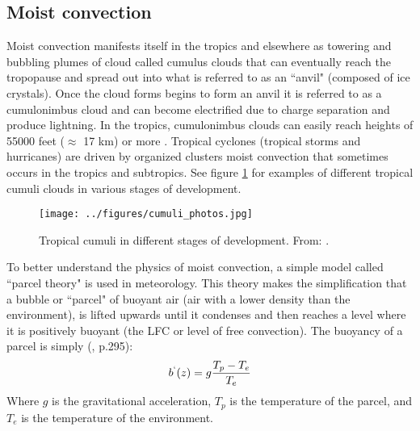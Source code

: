 \documentclass[letterpaper,12pt,titlepage,oneside,final]{book}
\begin{document}
\subsection{Moist convection}\label{moist}

Moist convection manifests itself in the tropics and elsewhere as towering and bubbling plumes of cloud called cumulus clouds that can eventually reach the tropopause and spread out into what is referred to as an ``anvil" (composed of ice crystals). Once the cloud forms begins to form an anvil it is referred to as a cumulonimbus cloud and can become electrified due to charge separation and produce lightning. In the tropics, cumulonimbus clouds can easily reach heights of 55000 feet ($\approx$ 17 km) or more \citep{hollars_comparisons_2004}. Tropical cyclones (tropical storms and hurricanes) are driven by organized clusters moist convection that sometimes occurs in the tropics and subtropics. See figure \ref{fig:cumu} for examples of different tropical cumuli clouds in various stages of development.

\begin{figure}[H]
\centering
\noindent\texttt{[image: ../figures/cumuli\_photos.jpg]}\hfill
\caption{Tropical cumuli in different stages of development. From: \citep{evans_introduction_2011}.}
\label{fig:cumu}
\end{figure}

To better understand the physics of moist convection, a simple model called ``parcel theory" is used in meteorology. This theory makes the simplification that a bubble or ``parcel" of buoyant air (air with a lower density than the environment), is lifted upwards until it condenses and then reaches a level where it is positively buoyant (the LFC or level of free convection). The buoyancy of a parcel is simply (\citep{holton_introduction_2004}, p.295):
\begin{align}
b^{`}(z)=g\frac{T_{p}-T_{e}}{T_{e}}
\end{align}
Where $g$ is the gravitational acceleration, $T_{p}$ is the temperature of the parcel, and $T_{e}$ is the temperature of the environment.
\end{document}
